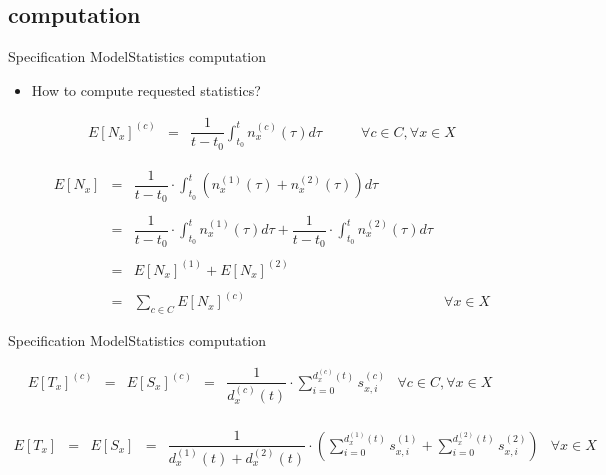 \documentclass[10pt]{beamer}
\begin{document}

\subsection{computation}
\begin{frame}{Specification Model}{Statistics computation}

\begin{itemize}
\item How to compute requested statistics?


\begin{equation}
\begin{array} {rclr} 
E[N_x]^{(c)} & = & \displaystyle  \dfrac{1}{t-t_0}\int_{t_0}^t n_x^{(c)}(\tau)d\tau & \qquad \forall c \in C, \forall x \in X
\end{array}
\end{equation}

\begin{equation}
\begin{array} {rclr} 
E[N_x] & = & \displaystyle  \dfrac{1}{t-t_0} \cdot \int_{t_0}^t \left( n_x^{(1)}(\tau) + n_x^{(2)}(\tau) \right) d\tau \\\\
	   & = & \displaystyle  \dfrac{1}{t-t_0} \cdot \int_{t_0}^t n_x^{(1)}(\tau)d\tau + \dfrac{1}{t-t_0} \cdot \int_{t_0}^t n_x^{(2)}(\tau)d\tau \\\\
	   & = & E[N_x]^{(1)} + E[N_x]^{(2)} \\\\
	   & = & \displaystyle  \sum_{c \in C} E[N_x]^{(c)} & \forall x \in X
\end{array}
\end{equation}

\end{itemize}
\end{frame}

\begin{frame}{Specification Model}{Statistics computation}

\begin{equation}
\begin{array} {rccccr} 
E[T_x]^{(c)} & = & E[S_x]^{(c)} & = & \displaystyle \dfrac{1}{d_x^{(c)}(t)} \cdot \sum_{i = 0}^{d_x^{(c)}(t)} s_{x,i}^{(c)} & \forall c \in C, \forall x \in X \\
\end{array}
\end{equation}

\begin{equation}
\begin{array} {rccccr} 
E[T_x] & = & E[S_x] & = & \displaystyle \dfrac{1}{d_x^{(1)}(t) + d_x^{(2)}(t)} \cdot \left( \sum_{i = 0}^{d_x^{(1)}(t)} s_{x,i}^{(1)} + \sum_{i = 0}^{d_x^{(2)}(t)} s_{x,i}^{(2)} \right) & \forall x \in X \\
\end{array}
\end{equation}


\end{frame}
\end{document}
